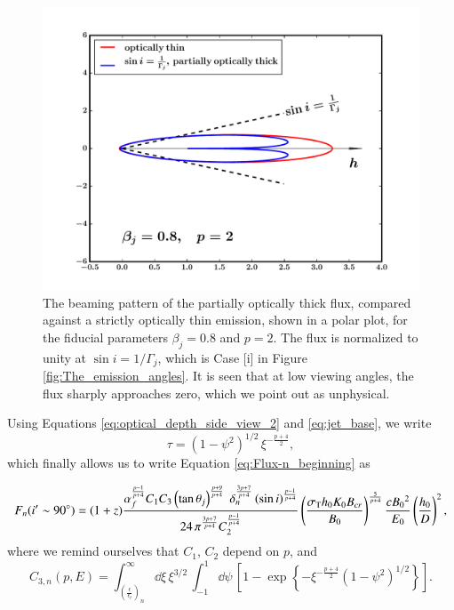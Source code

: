 \begin{figure}
\begin{center}
\includegraphics[scale=0.5]{beaming_initial.pdf}
\caption[The beaming pattern of the partially optically thick flux: side-view case]{The beaming pattern of the partially optically thick flux, compared against a strictly optically thin emission, shown in a polar plot, for the fiducial parameters $ \beta_j = 0.8 $ and $p = 2$. The flux is normalized to unity at $\sin i = 1 / \Gamma_j$, which is Case [i] in Figure \ref{fig:The_emission_angles}. It is seen that at low viewing angles, the flux sharply approaches zero, which we point out as unphysical.}
\label{fig:beaming_initial}
\end{center}
\end{figure}

Using Equations \ref{eq:optical_depth_side_view_2} and \ref{eq:jet_base}, we write
\begin{equation}
\tau = (1 - \psi^{2})^{1/2} \, \xi^{- \frac{p+4}{2} },
\label{eq:tau_to_integrate}
\end{equation} which finally allows us to write Equation \ref{eq:Flux-n_beginning} as

\begin{equation}
F_n (i' \sim 90^{\circ}) = (1+z) \dfrac{\alpha_f^{\frac{p-1}{p+4}} C_{1} C_{3} \left( \tan \theta_{j} \right)^{\frac{p+9}{p+4}} \; \delta_n^{\frac{3p+7}{p+4}} \left( \sin i \right) ^{\frac{p-1}{p+4}}}{24 \, \pi^{\frac{3p+7}{p+4}} C_{2} ^{\frac{p-1}{p+4}}} \left(\dfrac{\sigma_{\rm{T}} h_0 K_0 B_{cr}}{B_0}\right)^{\frac{5}{p+4}} \frac{ c B_0{^2} }{E_0} \left(\frac{h_0}{D}\right)^2,
\label{eq:Flux_side_view}
\end{equation} where we remind ourselves that $C_1$, $C_2$ depend on $p$, and
\begin{equation}
C_{3,n}(p, E) = \int_{\left(\frac{\epsilon}{\epsilon_{t}}\right)_{n}}^{\infty} \dd \xi \, \xi^{3/2} \, \int_{-1}^{1} \dd \psi\, \left[ 1 - \exp \left\{ -\xi^{-\frac{p+4}{2}}\left(1-\psi^{2}\right)^{1/2} \right\} \right].
\label{eq:C_3_double_integral}
\end{equation}

